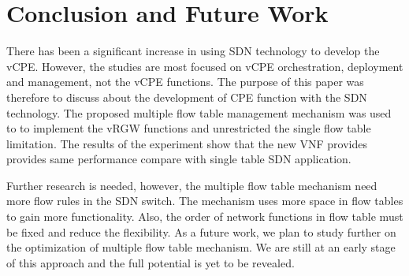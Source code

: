 \chapter{Conclusion and Future Work} \label{ch:conclusion}

There has been a significant increase in using SDN technology to develop the vCPE.
However, the studies are most focused on vCPE orchestration, deployment and management, not the vCPE functions.
The purpose of this paper was therefore to discuss about the development of CPE function with the SDN technology.
The proposed multiple flow table management mechanism was used to to implement the vRGW functions and unrestricted the single flow table limitation.
The results of the experiment show that the new VNF provides provides same performance compare with single table SDN application.

Further research is needed, however, the multiple flow table mechanism need more flow rules in the SDN switch.
The mechanism uses more space in flow tables to gain more functionality.
Also, the order of network functions in flow table must be fixed and reduce the flexibility.
As a future work, we plan to study further on the optimization of multiple flow table mechanism. We are still at an early stage of this approach and the full potential is yet to be revealed.
